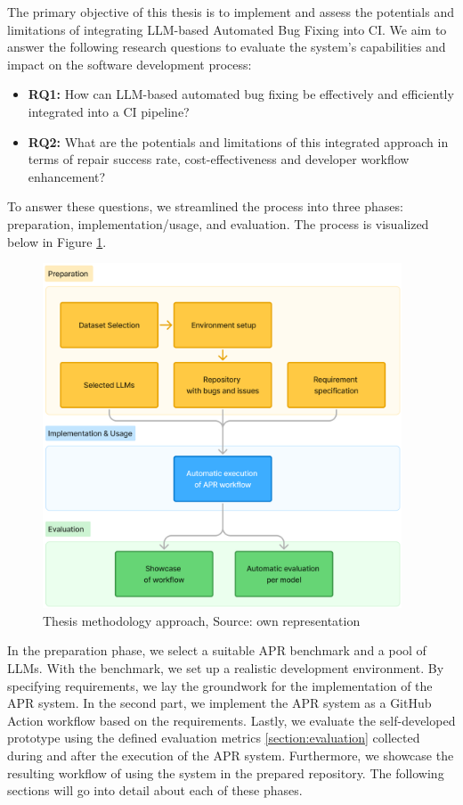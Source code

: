 The primary objective of this thesis is to implement and assess the potentials and limitations of integrating LLM-based Automated Bug Fixing into \acf{CI}. We aim to answer the following research questions to evaluate the system's capabilities and impact on the software development process:

\begin{itemize}
    \item \textbf{RQ1:} How can LLM-based automated bug fixing be effectively and efficiently integrated into a \ac{CI} pipeline?
    \item \textbf{RQ2:} What are the potentials and limitations of this integrated approach in terms of repair success rate, cost-effectiveness and developer workflow enhancement?
\end{itemize}

To answer these questions, we streamlined the process into three phases: preparation, implementation/usage, and evaluation. The process is visualized below in Figure \ref{fig:method-overview}.

\begin{figure}[H]
    \centering
    \includegraphics[width=0.95\textwidth]{images/flowcharts/method.png}
    \caption{Thesis methodology approach, Source: own representation}
    \label{fig:method-overview}
\end{figure}

In the preparation phase, we select a suitable APR benchmark and a pool of \acp{LLM}. With the benchmark, we set up a realistic development environment. By specifying requirements, we lay the groundwork for the implementation of the APR system.
In the second part, we implement the APR system as a GitHub Action workflow based on the requirements.
Lastly, we evaluate the self-developed prototype using the defined evaluation metrics \ref{section:evaluation} collected during and after the execution of the APR system. Furthermore, we showcase the resulting workflow of using the system in the prepared repository.
The following sections will go into detail about each of these phases.

